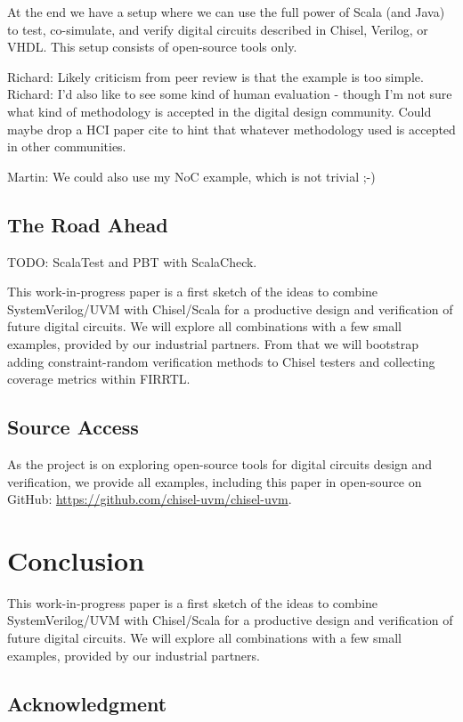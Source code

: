 \documentclass[conference]{IEEEtran}
\newcommand{\todo}[1]{{\color{olive} TODO: #1}}
\newcommand{\martin}[1]{{\color{blue} Martin: #1}}
\newcommand{\ducky}[1]{{\color{orange} Richard: #1}}
\begin{document}
At the end we have a setup where we can use the full power of Scala (and Java)
to test, co-simulate, and verify digital circuits described in Chisel, Verilog, or VHDL.
This setup consists of open-source tools only.

\ducky{Likely criticism from peer review is that the example is too simple.}
\ducky{I'd also like to see some kind of human evaluation - though I'm not sure what kind of methodology is accepted in the digital design community. Could maybe drop a HCI paper cite to hint that whatever methodology used is accepted in other communities.}

\martin{We could also use my NoC example, which is not trivial ;-)}




\subsection{The Road Ahead}

\todo{ScalaTest and PBT with ScalaCheck.}

This work-in-progress paper is a first sketch of the ideas to combine SystemVerilog/UVM
with Chisel/Scala for a productive design and verification of future digital circuits.
We will explore all combinations with a few small examples, provided by our industrial
partners.
From that we will bootstrap adding constraint-random verification methods to Chisel
testers and collecting coverage metrics within FIRRTL.

\subsection{Source Access}

As the project is on exploring open-source tools for digital circuits design
and verification, we provide all examples, including this paper in open-source
on GitHub: \url{https://github.com/chisel-uvm/chisel-uvm}.


\section{Conclusion}
\label{sec:conclusion}

This work-in-progress paper is a first sketch of the ideas to combine SystemVerilog/UVM
with Chisel/Scala for a productive design and verification of future digital circuits.
We will explore all combinations with a few small examples, provided by our industrial
partners.


\subsection*{Acknowledgment}
\end{document}
